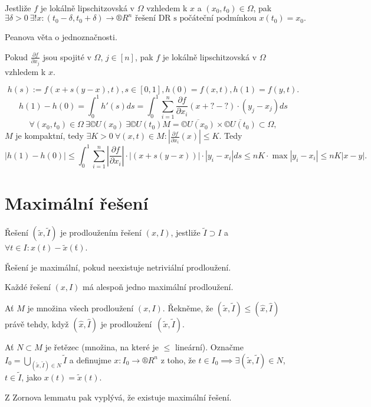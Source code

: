 \documentclass[12pt]{article}					%
\begin{document}

\begin{dusledek}
	Jestliže $f$ je lokálně lipschitzovská v $\Omega$ vzhledem k $x$ a $(x_0, t_0) \in \Omega$, pak
	$$ \exists \delta > 0\ \exists! x: (t_0 - \delta, t_0 + \delta) \rightarrow ®R^n \text{ řešení DR s počáteční podmínkou } x(t_0) = x_0. $$

	\begin{dukazin}
		Peanova věta o jednoznačnosti.
	\end{dukazin}
\end{dusledek}

\begin{tvrzeni}
	Pokud $\frac{\partial f}{\partial x_j}$ jsou spojité v $\Omega$, $j \in [n]$, pak $f$ je lokálně lipschitzovská v $\Omega$ vzhledem k $x$.

	\begin{dukazin}
		$$ h(s) := f(x + s(y - x), t), s \in [0, 1], h(0) = f(x, t), h(1) = f(y, t). $$
		$$ h(1) - h(0) = \int_0^1 h'(s) ds = \int_0^1 \sum_{i=1}^n \frac{\partial f}{\partial x_i} (x + ? - ?)·(y_j - x_j)ds $$
		$$ \forall (x_0, t_0) \in \Omega\ \exists ©U(x_0)\ \exists ©U(t_0) M = \overline{©U(x_0)} \times \overline{©U(t_0)} \subset \Omega, $$
		$M$ je kompaktní, tedy $\exists K > 0\ \forall (x, t) \in M: \left|\frac{\partial f}{\partial x_i}(x)\right| ≤ K$. Tedy
		$$ |h(1) - h(0)| ≤ \int_0^1 \sum_{i=1}^n \left| \frac{\partial f}{\partial x_i}\right|·|(x + s(y - x))|·|y_i - x_i| ds ≤ n K·\max|y_i - x_i| ≤ n K |x - y|. $$
	\end{dukazin}
\end{tvrzeni}

\section{Maximální řešení}
\begin{definice}
	Řešení $(\tilde x, \tilde I)$ je prodloužením řešení $(x, I)$, jestliže $\tilde I \supset I$ a $\forall t \in I: x(t) - \tilde x(ť)$.

	Řešení je maximální, pokud neexistuje netriviální prodloužení.
\end{definice}

\begin{veta}
	Každé řešení $(x, I)$ má alespoň jedno maximální prodloužení.

	\begin{dukazin}
		Ať $M$ je množina všech prodloužení $(x, I)$. Řekněme, že $(\tilde x, \tilde I) ≤ (\hat{x}, \hat{I})$ právě tehdy, když $(\hat{x}, \hat{I})$ je prodloužení $(\tilde x, \tilde I)$.

		Ať $N \subset M$ je řetězec (množina, na které je $≤$ lineární). Označme $I_0 = \bigcup_{(\tilde x, \tilde I) \in N} \tilde{I}$ a definujme $x: I_0 \rightarrow ®R^n$ z toho, že $t \in I_0 \implies \exists (\tilde x, \tilde I) \in N$, $t \in \tilde I$, jako $x(t) = \tilde x(t)$.

		Z Zornova lemmatu pak vyplývá, že existuje maximální řešení.
	\end{dukazin}
\end{veta}
\end{document}
